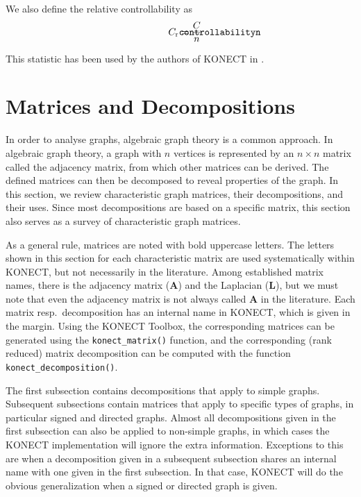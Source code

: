 \documentclass{article}
\def\mathnote#1{%
  \tag*{\rlap{\hspace\marginparsep\smash{\parbox[t]{\marginparwidth}{#1}}}}
}
\begin{document}
We also define the relative controllability as
\begin{align*}
  \mathnote{\texttt{controllabilityn}}
  C_{\mathrm r} &= \frac C n 
\end{align*}

This statistic has been used by the authors of KONECT in
\citep{kunegis:network-rank}. 

\section{Matrices and Decompositions}
\label{sec:matrix}
In order to analyse graphs, algebraic graph theory is a common
approach.  In algebraic graph theory, a graph with $n$ vertices is
represented by an $n\times n$ matrix called the adjacency matrix, from
which other matrices can be derived.  The defined matrices can then be
decomposed to reveal properties of the graph. 
In this section, we review characteristic graph matrices, their
decompositions, and their uses.  Since most decompositions are based on
a specific matrix, this section also serves as a survey of
characteristic graph matrices.  

As a general rule, matrices are noted with bold uppercase letters.  The
letters shown in this section for each characteristic matrix are used
systematically within KONECT, but not necessarily in the literature.
Among established matrix names, there is the adjacency matrix ($\mathbf
A$) and the Laplacian ($\mathbf L$), but we must note that even the
adjacency matrix is not always called $\mathbf A$ in the literature.
Each matrix resp.\ decomposition has an internal name in KONECT, which
is given in the margin.  Using the KONECT Toolbox, the corresponding
matrices can be generated using the \texttt{konect\_matrix()} function,
and the corresponding (rank reduced) matrix decomposition can be
computed with the function \texttt{konect\_decomposition()}. 

The first subsection contains decompositions that apply to simple
graphs.  Subsequent subsections contain matrices that apply to specific
types of graphs, in particular signed and directed graphs.  Almost all
decompositions given in the first subsection can also be applied to
non-simple graphs, in which cases the KONECT implementation will ignore
the extra information.  Exceptions to this are when a decomposition
given in a subsequent subsection shares an internal name with one given
in the first subsection.  In that case, KONECT will do the obvious
generalization when a signed or directed graph is given. 
\end{document}
